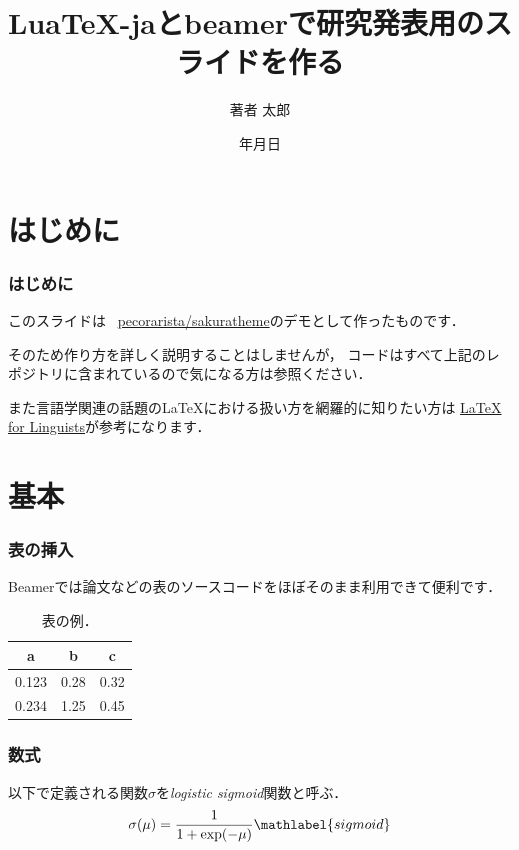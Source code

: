 \documentclass[%
    hyperref={colorlinks,linkcolor=sDarkBlue,urlcolor=sDarkBlue,citecolor=sDarkBlue}
]{beamer}
\title{Lua\TeX{}-jaとbeamerで研究発表用のスライドを作る}
\institute{所属}
\author{著者 太郎}
\date{{\number\year}年{\number\month}月{\number\day}日}
\DeclareMathOperator{\exponential}{exp}
\newcommand\header[1]{\multicolumn{1}{c}{\textbf{#1}}}
\begin{document}
    \maketitle

    \section{はじめに}
    \begin{frame}
        \frametitle{はじめに}
        このスライドは \faGithub\ \href{https://github.com/pecorarista/sakuratheme}{\ttfamily pecorarista/sakuratheme}のデモとして作ったものです．

        \bigskip

        そのため作り方を詳しく説明することはしませんが，
        コードはすべて上記のレポジトリに含まれているので気になる方は参照ください．
        \bigskip

        また言語学関連の話題の\LaTeX における扱い方を網羅的に知りたい方は
        \href{https://www1.essex.ac.uk/linguistics/external/clmt/latex4ling/}
        {LaTeX for Linguists}が参考になります．
    \end{frame}

    \section{基本}
    \begin{frame}
        \frametitle{表の挿入}
        Beamerでは論文などの表のソースコードをほぼそのまま利用できて便利です．
        \begin{table}
            \caption{表の例．}
            \begin{tabular}{rrr}
                \toprule
                \header{a} & \header{b} & \header{c} \\
                \midrule
                0.123 & 0.28  & 0.32 \\
                0.234 & 1.25  & 0.45 \\
                \bottomrule
            \end{tabular}
        \end{table}
    \end{frame}

    \begin{frame}
        \frametitle{数式}
        以下で定義される関数$\sigma$を\emph{logistic sigmoid}関数と呼ぶ\citep{prml}．
        \begin{align}
            \sigma(\mu) = \frac{1}{1 + \exponential(-\mu)} \mathlabel{sigmoid}
        \end{align}
    \end{frame}
\end{document}
